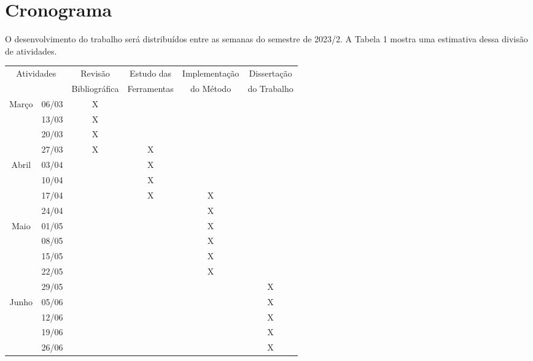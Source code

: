 \chapter{Cronograma}\label{cap:cronograma}

O desenvolvimento do trabalho será distribuídos entre as semanas do semestre
de 2023/2. A Tabela 1 mostra uma estimativa dessa divisão de atividades.

\begin{table}[]
\begin{tabular}{cc|c|c|c|c}
\hline
\multicolumn{2}{|c|}{Atividades} & Revisão       & Estudo das  & Implementação & Dissertação \\
\multicolumn{2}{|c|}{}           & Bibliográfica & Ferramentas & do Método     & do Trabalho \\ \hline
\multicolumn{1}{|c|}{\multirow{4}{*}{Março}}    & 06/03  & X &   &   &   \\ \cline{2-6}
\multicolumn{1}{|c|}{}                          & 13/03  & X &   &   &   \\ \cline{2-6}
\multicolumn{1}{|c|}{}                          & 20/03  & X &   &   &   \\ \cline{2-6}
\multicolumn{1}{|c|}{}                          & 27/03  & X & X &   &   \\ \hline
\multicolumn{1}{|c|}{\multirow{4}{*}{Abril}}    & 03/04  &   & X &   &   \\ \cline{2-6}
\multicolumn{1}{|c|}{}                          & 10/04  &   & X &   &   \\ \cline{2-6}
\multicolumn{1}{|c|}{}                          & 17/04  &   & X & X &   \\ \cline{2-6}
\multicolumn{1}{|c|}{}                          & 24/04  &   &   & X &   \\ \hline
\multicolumn{1}{|c|}{\multirow{5}{*}{Maio}}     & 01/05  &   &   & X &   \\ \cline{2-6}
\multicolumn{1}{|c|}{}                          & 08/05  &   &   & X &   \\ \cline{2-6}
\multicolumn{1}{|c|}{}                          & 15/05  &   &   & X &   \\ \cline{2-6}
\multicolumn{1}{|c|}{}                          & 22/05  &   &   & X &   \\ \cline{2-6}
\multicolumn{1}{|c|}{}                          & 29/05  &   &   &   & X \\ \hline
\multicolumn{1}{|c|}{\multirow{4}{*}{Junho}}    & 05/06  &   &   &   & X \\ \cline{2-6}
\multicolumn{1}{|c|}{}                          & 12/06  &   &   &   & X \\ \cline{2-6}
\multicolumn{1}{|c|}{}                          & 19/06  &   &   &   & X \\ \cline{2-6}
\multicolumn{1}{|c|}{}                          & 26/06  &   &   &   & X \\ \hline
\end{tabular}
\end{table}